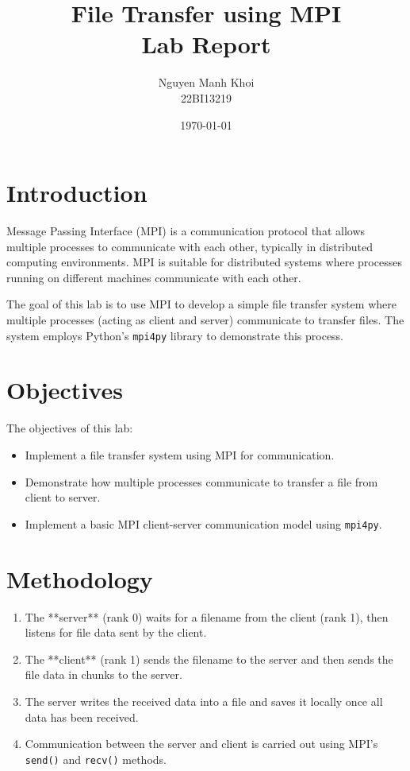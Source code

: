 \documentclass[a4paper,12pt]{article}
\title{File Transfer using MPI\\ \large Lab Report}
\author{Nguyen Manh Khoi \\ 22BI13219}
\date{\today}
\begin{document}
\maketitle

\section{Introduction}
Message Passing Interface (MPI) is a communication protocol that allows multiple processes to communicate with each other, typically in distributed computing environments. MPI is suitable for distributed systems where processes running on different machines communicate with each other.

The goal of this lab is to use MPI to develop a simple file transfer system where multiple processes (acting as client and server) communicate to transfer files. The system employs Python's \texttt{mpi4py} library to demonstrate this process.

\section{Objectives}
The objectives of this lab:
\begin{itemize}
    \item Implement a file transfer system using MPI for communication.
    \item Demonstrate how multiple processes communicate to transfer a file from client to server.
    \item Implement a basic MPI client-server communication model using \texttt{mpi4py}.
\end{itemize}

\section{Methodology}

\begin{enumerate}
    \item The **server** (rank 0) waits for a filename from the client (rank 1), then listens for file data sent by the client.
    \item The **client** (rank 1) sends the filename to the server and then sends the file data in chunks to the server.
    \item The server writes the received data into a file and saves it locally once all data has been received.
    \item Communication between the server and client is carried out using MPI's \texttt{send()} and \texttt{recv()} methods.
\end{enumerate}
\end{document}
